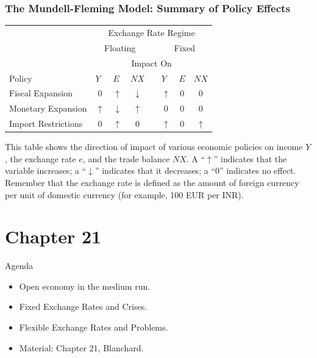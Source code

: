 \documentclass[shownotes,11pt, aspectratio=169]{beamer}
\begin{document}
\begin{frame}
\frametitle{The Mundell-Fleming Model: Summary of Policy Effects}
\linespread{1}
\begin{table}[htbp]
  \centering
  \begin{threeparttable}
    \begin{tabular}{lccccccc}
          & \multicolumn{7}{c}{Exchange Rate Regime} \\
\cmidrule{2-8}          & \multicolumn{3}{c}{Floating} &       & \multicolumn{3}{c}{Fixed} \\
\cmidrule{2-4}\cmidrule{6-8}          & \multicolumn{7}{c}{Impact On} \\
\cmidrule{2-8}    \multicolumn{1}{l}{Policy} & \multicolumn{1}{l}{$Y$} & \multicolumn{1}{l}{$E$} & \multicolumn{1}{l}{$NX$} &       & \multicolumn{1}{l}{$Y$} & \multicolumn{1}{l}{$E$} & \multicolumn{1}{l}{$NX$} \\
    \midrule
    Fiscal Expansion & 0     & $\uparrow$   & $\downarrow$    &       & $\uparrow$     & 0     & 0 \\
    Monetary Expansion & $\uparrow$   & $\downarrow$     & $\uparrow$     &       & 0     & 0     & 0 \\
    Import Restrictions & 0     & $\uparrow$     & 0     &       & $\uparrow$    & 0     & $\uparrow$ \\
    \bottomrule
    \end{tabular}%
    \begin{tablenotes}
    \tiny
\item This table shows the direction of impact of various economic policies on income $Y$, the
exchange rate $e$, and the trade balance $NX$. A ``$\uparrow$'' indicates that the variable increases; a ``$\downarrow$''
indicates that it decreases; a ``0'' indicates no effect. Remember that the exchange rate is
defined as the amount of foreign currency per unit of domestic currency (for example, 100 EUR per INR).
        \end{tablenotes}
     \end{threeparttable}
\end{table}%
\end{frame}

\section{Chapter 21}

\begin{frame}{Agenda}
\begin{itemize}
\item Open economy in the medium run.
\item Fixed Exchange Rates and Crises.
\item Flexible Exchange Rates and Problems.
\item Material: Chapter 21, Blanchard.
\end{itemize}
\end{frame}
\end{document}
